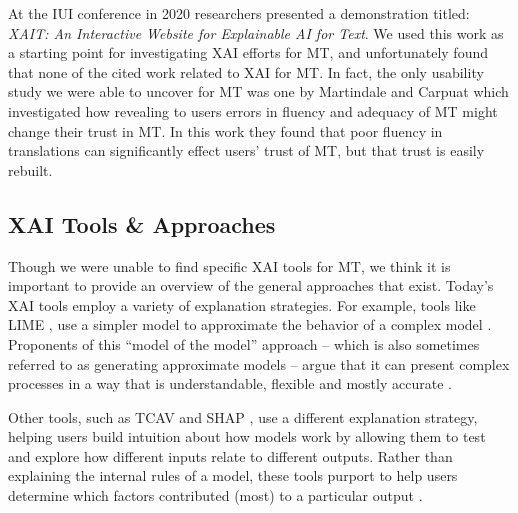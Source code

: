 At the IUI conference in 2020 researchers presented a demonstration titled: \textit{XAIT: An Interactive Website for Explainable AI for Text}. We used this work as a starting point for investigating XAI efforts for MT, and unfortunately found that none of the cited work related to XAI for MT\cite{oduor2020XAIT}. In fact, the only usability study we were able to uncover for MT was one by Martindale and Carpuat which investigated how revealing to users errors in fluency and adequacy of MT might change their trust in MT. In this work they found that poor fluency in translations can significantly effect users' trust of MT, but that trust is easily rebuilt\cite{martindaleFluency2018}.       

\subsection{XAI Tools \& Approaches}
Though we were unable to find specific XAI tools for MT, we think it is important to provide an overview of the general approaches that exist. Today’s XAI tools employ a variety of explanation strategies. For example, tools like LIME \cite{RiberoLIME2016}, use a simpler model to approximate the behavior of a complex model \cite{SelbstBarocasIntuitive2018}. Proponents of this “model of the model” \cite{SelbstBarocasIntuitive2018} approach – which is also sometimes referred to as generating approximate models – argue that it can present complex processes in a way that is understandable, flexible and mostly accurate \cite{MittelstadtRussellExplain2019}. %

Other tools, such as TCAV \cite{KimTCAV2018} and SHAP \cite{LundbergLeeSHAP2017}, use a different explanation strategy, helping users build intuition about how models work by allowing them to test and explore how different inputs relate to different outputs. Rather than explaining the internal rules of a model, these tools purport to help users determine which factors contributed (most) to a particular output \cite{SelbstBarocasIntuitive2018}. %

